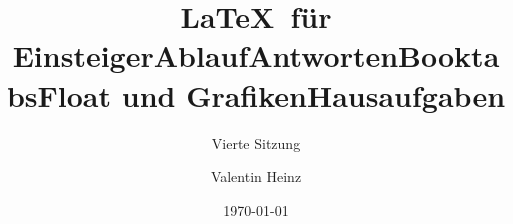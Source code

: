 \documentclass[]{beamer}
\date{}
\author{Valentin Heinz}
\title{\LaTeX \ für Einsteiger}
\subtitle{Vierte Sitzung}
\date{\today}
\begin{document}
\maketitle

\title{Ablauf}


\title{Antworten}


\title{Booktabs}


\title{Float und Grafiken}


\title{Hausaufgaben}


\end{document}
